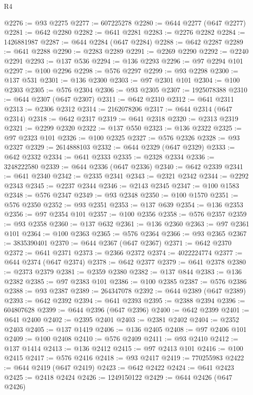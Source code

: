 \begin{lexlean}{R4}
\begin{coremodule}
@2276 := @93 @2275
@2277 := 607225278
@2280 := @644 @2277 (@647 @2277)
@2281 := @642 @2280
@2282 := @641 @2281
@2283 := @2276 @2282
@2284 := 1426881987
@2287 := @644 @2284 (@647 @2284)
@2288 := @642 @2287
@2289 := @641 @2288
@2290 := @2283 @2289
@2291 := @2269 @2290
@2292 := @2240 @2291
@2293 := @137 @536
@2294 := @136 @2293
@2296 := @97 @2294 @101
@2297 := @100 @2296
@2298 := @576 @2297
@2299 := @93 @2298
@2300 := @137 @531
@2301 := @136 @2300
@2303 := @97 @2301 @101
@2304 := @100 @2303
@2305 := @576 @2304
@2306 := @93 @2305
@2307 := 1925078388
@2310 := @644 @2307 (@647 @2307)
@2311 := @642 @2310
@2312 := @641 @2311
@2313 := @2306 @2312
@2314 := 2162078206
@2317 := @644 @2314 (@647 @2314)
@2318 := @642 @2317
@2319 := @641 @2318
@2320 := @2313 @2319
@2321 := @2299 @2320
@2322 := @137 @550
@2323 := @136 @2322
@2325 := @97 @2323 @101
@2326 := @100 @2325
@2327 := @576 @2326
@2328 := @93 @2327
@2329 := 2614888103
@2332 := @644 @2329 (@647 @2329)
@2333 := @642 @2332
@2334 := @641 @2333
@2335 := @2328 @2334
@2336 := 3248222580
@2339 := @644 @2336 (@647 @2336)
@2340 := @642 @2339
@2341 := @641 @2340
@2342 := @2335 @2341
@2343 := @2321 @2342
@2344 := @2292 @2343
@2345 := @2237 @2344
@2346 := @2143 @2345
@2347 := @100 @1583
@2348 := @576 @2347
@2349 := @93 @2348
@2350 := @100 @1570
@2351 := @576 @2350
@2352 := @93 @2351
@2353 := @137 @639
@2354 := @136 @2353
@2356 := @97 @2354 @101
@2357 := @100 @2356
@2358 := @576 @2357
@2359 := @93 @2358
@2360 := @137 @632
@2361 := @136 @2360
@2363 := @97 @2361 @101
@2364 := @100 @2363
@2365 := @576 @2364
@2366 := @93 @2365
@2367 := 3835390401
@2370 := @644 @2367 (@647 @2367)
@2371 := @642 @2370
@2372 := @641 @2371
@2373 := @2366 @2372
@2374 := 4022224774
@2377 := @644 @2374 (@647 @2374)
@2378 := @642 @2377
@2379 := @641 @2378
@2380 := @2373 @2379
@2381 := @2359 @2380
@2382 := @137 @844
@2383 := @136 @2382
@2385 := @97 @2383 @101
@2386 := @100 @2385
@2387 := @576 @2386
@2388 := @93 @2387
@2389 := 264347078
@2392 := @644 @2389 (@647 @2389)
@2393 := @642 @2392
@2394 := @641 @2393
@2395 := @2388 @2394
@2396 := 604807628
@2399 := @644 @2396 (@647 @2396)
@2400 := @642 @2399
@2401 := @641 @2400
@2402 := @2395 @2401
@2403 := @2381 @2402
@2404 := @2352 @2403
@2405 := @137 @1419
@2406 := @136 @2405
@2408 := @97 @2406 @101
@2409 := @100 @2408
@2410 := @576 @2409
@2411 := @93 @2410
@2412 := @137 @1414
@2413 := @136 @2412
@2415 := @97 @2413 @101
@2416 := @100 @2415
@2417 := @576 @2416
@2418 := @93 @2417
@2419 := 770255983
@2422 := @644 @2419 (@647 @2419)
@2423 := @642 @2422
@2424 := @641 @2423
@2425 := @2418 @2424
@2426 := 1249150122
@2429 := @644 @2426 (@647 @2426)

\end{coremodule}
\end{lexlean}
